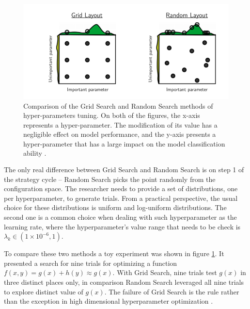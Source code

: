 \begin{figure}
\centering
\includegraphics{figures/GridSearch.png}
\caption{Comparison of the Grid Search and Random Search methods of hyper-parameters tuning. 
On both of the figures, the x-axis represents a hyper-parameter. The modification of its value has a negligible effect on model performance, and the y-axis presents a hyper-parameter that has a large impact on the model classification ability \cite{RandomSearch}. 
\label{fig:GridSearch}}
\end{figure} 

The only real difference between Grid Search and Random Search is on step 1 of the strategy cycle – Random Search picks the point randomly from the configuration space. 
The researcher needs to provide a set of distributions, one per hyperparameter, to generate trials. From a practical perspective, the usual choice for these distributions is uniform and log-uniform distributions. The second one is a common choice when dealing with such hyperparameter as the learning rate, where the hyperparameter's value range that needs to be check is   $ \lambda_k \in (1\times 10^{-6},1)$. 


To compare these two methods a toy experiment was shown in figure \ref{fig:GridSearch}. It presented a search for nine trials for optimizing a function \\ $f(x,y) = g(x) + h(y) \approx g(x)$. With Grid Search, nine trials test $g(x)$ in three distinct places only, in comparison Random Search leveraged all nine trials to explore distinct value of $g(x)$. The failure of Grid Search is the rule rather than the exception in high dimensional hyperparameter optimization \cite{RandomSearch}. 


